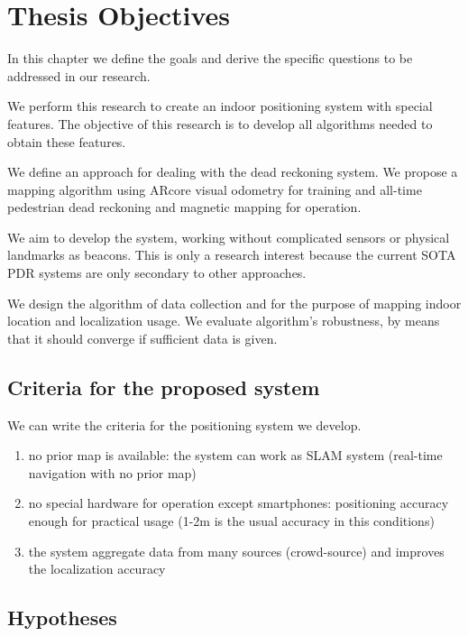 \chapter{Thesis Objectives}
\label{cap:thesis_objectives}


In this chapter we define the goals and derive the specific questions to be addressed in our research.

We perform this research to create an indoor positioning system with special features. The objective of this research is to develop all algorithms needed to obtain these features.

We define an approach for dealing with the dead reckoning system. We propose a mapping algorithm using ARcore visual odometry for training and all-time pedestrian dead reckoning and magnetic mapping for operation.

We aim to develop the system, working without complicated sensors or physical landmarks as beacons. This is only a research interest because the current SOTA PDR systems are only secondary to other approaches.

We design the algorithm of data collection and for the purpose of mapping indoor location and localization usage. 
We evaluate algorithm's robustness, by means that it should converge if sufficient data is given.

\section*{Criteria for the proposed system}

We can write the criteria for the positioning system we develop.
\begin{enumerate}
	\item no prior map is available: the system can work as SLAM system (real-time navigation with no prior map)
	\item no special hardware for operation except smartphones: positioning accuracy enough for practical usage (1-2m is the usual accuracy in this conditions)
	\item the system aggregate data from many sources (crowd-source) and improves the localization accuracy
\end{enumerate}

\section*{Hypotheses}

